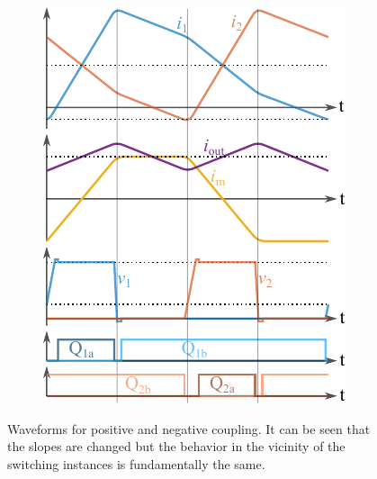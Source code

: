 \documentclass{IPEC2026}
\begin{document}
\begin{figure}
\begin{subfigure}[c]{0.48\columnwidth}
      \includegraphics[width=\textwidth]{figures/Inkscape/Waveforms_positive.pdf}
      \label{fig:waveform_posCoupling}
    \end{subfigure}
  \caption{Waveforms for positive and negative coupling. It can be seen that the slopes are changed but the behavior in the vicinity of the switching instances is fundamentally the same.}
  \label{fig:waveform_Coupling}
\end{figure}
\end{document}
